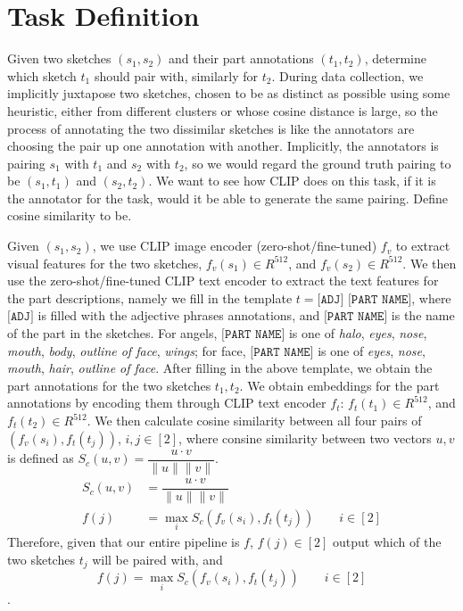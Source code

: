 \section{Task Definition}
Given two sketches $(s_1,s_2)$ and their part annotations $(t_1,t_2)$, determine which sketch $t_1$ should pair with, similarly for $t_2$. 
During data collection, we implicitly juxtapose two sketches, chosen to be as distinct as possible using some heuristic, either from different clusters or whose cosine distance is large, so the process of annotating the two dissimilar sketches is like the annotators are choosing the pair up one annotation with another. Implicitly, the annotators is pairing $s_1$ with $t_1$ and $s_2$ with $t_2$, so we would regard the ground truth pairing to be $(s_1,t_1)$ and $(s_2,t_2)$. We want to see how CLIP does on this task, if it is the annotator for the task, would it be able to generate the same pairing. Define cosine similarity to be.  



Given $(s_1,s_2)$, we use CLIP image encoder (zero-shot/fine-tuned) $f_v$ to extract visual features for the two sketches,  $f_v(s_1) \in {R}^{512}$, and $f_v(s_2) \in {R}^{512}$. We then use the zero-shot/fine-tuned CLIP text encoder to extract the text features for the part descriptions, namely we fill in the template $t = \texttt{[ADJ] [PART NAME]}$, where $\texttt{[ADJ]}$ is filled with the adjective phrases annotations, and $\texttt{[PART NAME]}$ is the name of the part in the sketches. For angels, $\texttt{[PART NAME]}$ is one of \textit{halo}, \textit{eyes}, \textit{nose}, \textit{mouth}, \textit{body}, \textit{outline of face}, \textit{wings}; for face, $\texttt{[PART NAME]}$ is one of \textit{eyes}, \textit{nose}, \textit{mouth}, \textit{hair}, \textit{outline of face}. After filling in the above template, we obtain the part annotations for the two sketches $t_1,t_2$.  
We obtain embeddings for the part annotations by encoding them through CLIP text encoder $f_t$: $f_t(t_1) \in {R}^{512}$, and $f_t(t_2) \in {R}^{512}$. We then calculate cosine similarity between all four pairs of $(f_v(s_i), f_t(t_j))$, $i,j \in [2]$, where consine similarity between two vectors $u,v$ is defined as $S_c(u,v) = \dfrac{u \cdot v}{\|u\| \|v\|}$. 
\begin{equation}
    \begin{split}
        S_c(u,v) & = \dfrac{u \cdot v}{\|u\| \|v\|} \\
        f(j) & = \max_{i} S_c(f_v(s_i), f_t(t_j)) \hspace{2em} i \in [2]
    \end{split}
\end{equation}
Therefore, given that our entire pipeline is $f$, $f(j) \in [2]$ output which of the two sketches $t_j$ will be paired with, and $$f(j) = \max_{i} S_c(f_v(s_i), f_t(t_j)) \hspace{2em} i \in [2]$$.    

